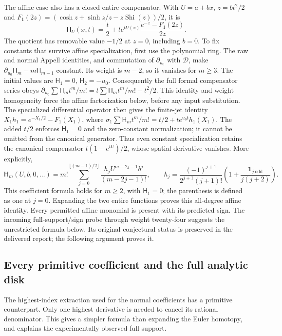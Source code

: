 The affine case also has a closed entire compensator. With
$U=a+bx$, $z=bt^2/2$ and
$F_1(2z)=(\cosh z+\sinh z/z-z\operatorname{Shi}(z))/2$, it is
\begin{equation}\label{ngp:affine}
 \boxed{\mathsf H_U(x,t)=\frac t2+t e^{tU(x)}
                 \frac{e^{-z}-F_1(2z)}{2z}.}
\end{equation}
The quotient has removable value $-1/2$ at $z=0$, including $b=0$.
To fix constants that survive affine specialization, first use the
polynomial ring. The raw and normal Appell identities, and commutation
of $\partial_{u_0}$ with $\mathcal D$, make
$\partial_{u_0}\mathsf H_m-m\mathsf H_{m-1}$ constant.
Its weight is $m-2$, so it vanishes for $m\ge3$.
The initial values are $\mathsf H_1=0$, $\mathsf H_2=-u_0$.
Consequently the full formal compensator series obeys
$\partial_{u_0}\sum\mathsf H_mt^m/m!
=t\sum\mathsf H_mt^m/m!-t^2/2$.
This identity and weight homogeneity force the affine factorization
below, before any input substitution. The specialized differential
operator then gives the finite-jet identity
$X_1h_1=e^{-X_1/2}-F_1(X_1)$, where
$\sigma_1\sum\mathsf H_mt^m/m!=t/2+t e^{u_0t}h_1(X_1)$.
The added $t/2$ enforces $\mathsf H_1=0$ and the zero-constant
normalization; it cannot be omitted from the canonical generator.
Thus even constant specialization retains the canonical compensator
$t(1-e^{tU})/2$, whose spatial derivative vanishes.
More explicitly,
\begin{equation}\label{ngp:affine-coefficients}
 \mathsf H_m(U,b,0,\ldots)=m!\sum_{j=0}^{\lfloor(m-1)/2\rfloor}
       \frac{h_j U^{m-2j-1}b^j}{(m-2j-1)!},\qquad
 h_j=\frac{(-1)^{j+1}}{2^{j+1}(j+1)!}
       \left(1+\frac{\mathbf1_{j\ \mathrm{odd}}}{j(j+2)}\right).
\end{equation}
This coefficient formula holds for $m\ge2$, with $\mathsf H_1=0$;
the parenthesis is defined as one at $j=0$.
Expanding the two entire functions proves this all-degree affine
identity. Every permitted affine monomial is present with its predicted
sign. The incoming full-support/sign probe through weight twenty-four
suggests the unrestricted formula below. Its original conjectural status
is preserved in the delivered report; the following argument proves it.

\subsection{Every primitive coefficient and the full analytic disk}

The highest-index extraction used for the normal coefficients has a
primitive counterpart. Only one highest derivative is needed to cancel
its rational denominator. This gives a simpler formula than expanding
the Euler homotopy, and explains the experimentally observed full support.

